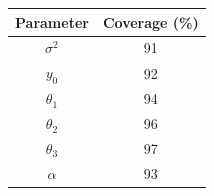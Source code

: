 \documentclass{article}
\begin{document}
\begin{center}
\begin{tabular}{c | c}
  Parameter & Coverage (\%) \\\hline
  $\sigma^2$ & 91\\
  $y_0$ & 92\\
  $\theta_1$ & 94\\
  $\theta_2$ & 96\\
  $\theta_3$ & 97\\
  $\alpha$ & 93
\end{tabular}
\end{center}
\end{document}

